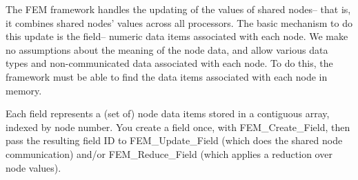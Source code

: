 \documentclass[11pt]{article}
\begin{document}
The FEM framework handles the updating of the values of shared nodes-- that
is, it combines shared nodes' values across all processors.  The basic
mechanism to do this update is the field-- numeric data items associated
with each node. We make no assumptions about the meaning of the node data,
and allow various data types and non-communicated data associated with each
node.  To do this, the framework must be able to find the data items
associated with each node in memory.

Each field represents a (set of) node data items stored in a contiguous
array, indexed by node number.  You create a field once, with
FEM\_Create\_Field, then pass the resulting field ID to FEM\_Update\_Field
(which does the shared node communication) and/or FEM\_Reduce\_Field (which
applies a reduction over node values).
\end{document}
